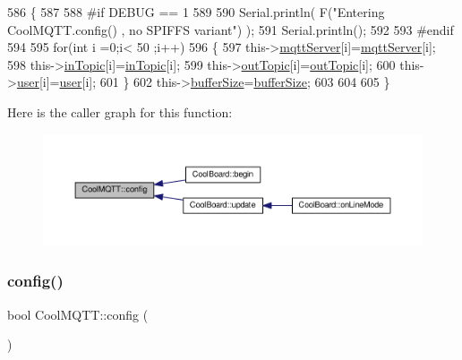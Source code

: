 \begin{DoxyCode}
586 \{
587 
588 \textcolor{preprocessor}{#if DEBUG == 1}
589 
590     Serial.println( F(\textcolor{stringliteral}{"Entering CoolMQTT.config() , no SPIFFS variant"}) );
591     Serial.println();
592 
593 \textcolor{preprocessor}{#endif}
594 
595     \textcolor{keywordflow}{for}(\textcolor{keywordtype}{int} i =0;i< 50 ;i++)
596     \{
597         this->\hyperlink{classCoolMQTT_ab8bb951f87ddbf92db74c2ad16a3e53e}{mqttServer}[i]=\hyperlink{classCoolMQTT_ab8bb951f87ddbf92db74c2ad16a3e53e}{mqttServer}[i];
598         this->\hyperlink{classCoolMQTT_a4492f52a441e83cc5151010317fdb52d}{inTopic}[i]=\hyperlink{classCoolMQTT_a4492f52a441e83cc5151010317fdb52d}{inTopic}[i];
599         this->\hyperlink{classCoolMQTT_a109c786a17b463f9eeba046194279522}{outTopic}[i]=\hyperlink{classCoolMQTT_a109c786a17b463f9eeba046194279522}{outTopic}[i];
600         this->\hyperlink{classCoolMQTT_a8cd47e45d457f908d4b4390b35aaee83}{user}[i]=\hyperlink{classCoolMQTT_a8cd47e45d457f908d4b4390b35aaee83}{user}[i];
601     \}
602     this->\hyperlink{classCoolMQTT_a7f3cf26b51d6770f216e42c5ef13ca9f}{bufferSize}=\hyperlink{classCoolMQTT_a7f3cf26b51d6770f216e42c5ef13ca9f}{bufferSize};
603     
604 
605 \}
\end{DoxyCode}
Here is the caller graph for this function\+:
\nopagebreak
\begin{figure}[H]
\begin{center}
\leavevmode
\includegraphics[width=350pt]{classCoolMQTT_a9b703de4f1358f0ee7a5e8c44979c648_icgraph}
\end{center}
\end{figure}
\mbox{\label{classCoolMQTT_a6571671781a505feca9a8a56e256c6bc}} 
\subsubsection{\texorpdfstring{config()}{config()}\hspace{0.1cm}{\footnotesize\ttfamily [2/2]}}
{\footnotesize\ttfamily bool Cool\+M\+Q\+T\+T\+::config (\begin{DoxyParamCaption}{ }\end{DoxyParamCaption})}

